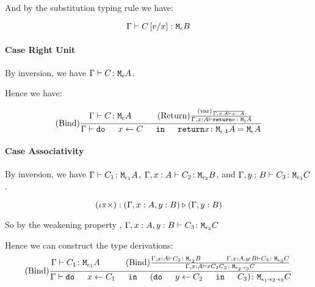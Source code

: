 \documentclass{report}
\begin{document}
        And by the substitution typing rule we have: 

        \begin{equation}
            \gtyperelation{C\ssub{x}{v}}{\meb}
        \end{equation}
        \paragraph{Case Right Unit}
        By inversion, we have $\gtyperelation{C}{\mea}$.

        Hence we have:

        \begin{equation}
            \treerule{Bind}{
                \gtyperelation{C}{\mea}
                \s\s
                \treerule{Return}{\treerule{var}{}{\typerelation{\gax}{x}{A}}}{\typerelation{\gax}{\return{v}}{\moa}}
            }{\gtyperelation{\doin{x}{C}{\return{x}}}{\M{\e\dot\1}{A} = \mea}}
        \end{equation}
        \paragraph{Case Associativity}
        By inversion, we have $\gtyperelation{C_1}{\M{\e_1}{A}}$, $\typerelation{\gax}{C_2}{\M{\e_2}{B}}$, and $\typerelation{\gby}{C_3}{\M{\e_3}{C}}$.

       
        
        $$\wrel{(\i\pi\times)}{(\gax, y: B)}{(\gby)}$$

        So by the weakening property , $\typerelation{\gax, y: B}{C_3}{\M{\e_3}{C}}$

        Hence we can construct the type derivations:
        \begin{equation} 
            \treerule{Bind}{
                \gtyperelation{C_1}{\M{\e_1}{A}}
                \s\s
                \treerule{Bind}{
                    \typerelation{\gax}{C_2}{\M{\e_2}{B}}
                    \s\s
                    \typerelation{\gax, y: B}{C_3}{\M{\e_3}{C}}
                }{
                    \typerelation{\gax}{\do{x}{C_2}{C_3}}{\M{\e_2 \dot \e_3}{C}}
                }
            }{
                \gtyperelation{
                    \doin{x}{C_1}{
                        (\doin{y}{C_2}{C_3})
                    }
                }{
                    \M{\e_1\dot\e_2\dot\e_3}{C}
                }
            }
        \end{equation}
\end{document}

